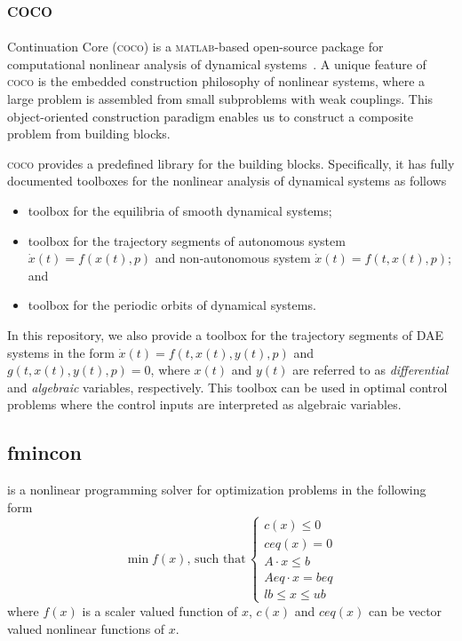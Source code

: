 \subsection{\textsc{coco}}
Continuation Core (\textsc{coco}) is a \textsc{matlab}-based open-source package for computational nonlinear analysis of dynamical systems~\cite{coco,coco-recipes}.
A unique feature of \textsc{coco} is the embedded construction philosophy of nonlinear systems, where a large problem is assembled from small subproblems with weak couplings. This object-oriented construction paradigm enables us to construct a composite problem from building blocks.

\textsc{coco} provides a predefined library for the building blocks. Specifically, it has fully documented toolboxes for the nonlinear analysis of dynamical systems as follows
\begin{itemize}
\item {} toolbox for the equilibria of smooth dynamical systems;
\item {} toolbox for the trajectory segments of autonomous system $\dot{x}(t)=f(x(t),p)$ and non-autonomous system $\dot{x}(t)=f(t,x(t),p)$; and
\item {} toolbox for the periodic orbits of dynamical systems.
\end{itemize}



In this repository, we also provide a toolbox for the trajectory segments of DAE systems in the form $\dot{x}(t)=f(t,x(t),y(t),p)$ and $g(t,x(t),y(t),p)=0$, where $x(t)$ and $y(t)$ are referred to as \emph{differential} and \emph{algebraic} variables, respectively. This toolbox can be used in optimal control problems where the control inputs are interpreted as algebraic variables.



\subsection{fmincon}
 is a nonlinear programming solver for optimization problems in the following form~\cite{fmincon}
\begin{equation}
\min f(x),\, \text{such that}\, 
\begin{cases}
c(x)\leq0\\
ceq(x)=0\\
A\cdot x\leq b\\
Aeq\cdot x=b{eq}\\
lb\leq x\leq ub  
\end{cases}
\end{equation}
where $f(x)$ is a scaler valued function of $x$, $c(x)$ and $ceq(x)$ can be vector valued nonlinear functions of $x$.

